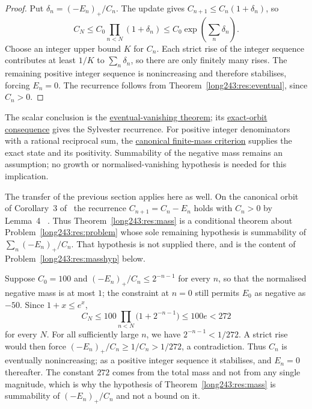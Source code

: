 \documentclass[11pt]{article}
\begin{document}
\begin{proof}
Put \(\delta_n=(-E_n)_+/C_n\). The update gives
\(C_{n+1}\le C_n(1+\delta_n)\), so
\[
 C_N\le C_0\prod_{n<N}(1+\delta_n)
 \le C_0\exp\!\left(\sum_n\delta_n\right).
\]
Choose an integer upper bound \(K\) for \(C_n\). Each strict rise of the
integer sequence contributes at least \(1/K\) to \(\sum_n\delta_n\), so
there are only finitely many rises. The remaining positive integer sequence
is nonincreasing and therefore stabilises, forcing \(E_n=0\). The recurrence
follows from Theorem~\ref{long243:res:eventual}, since \(C_n>0\).
\end{proof}

\noindent The scalar conclusion is the
\href{https://github.com/wcook04/plectis-erdos/blob/d058b9150218ae23d2cfd975580088d6167e9da8/ErdosProblems/Erdos243/SparseResetRecovery.lean#L612}{eventual-vanishing theorem};
its \href{https://github.com/wcook04/plectis-erdos/blob/d058b9150218ae23d2cfd975580088d6167e9da8/ErdosProblems/Erdos243/SparseResetRecovery.lean#L690}{exact-orbit consequence}
gives the Sylvester recurrence. For positive integer denominators with a
rational reciprocal sum, the
\href{https://github.com/wcook04/plectis-erdos/blob/d058b9150218ae23d2cfd975580088d6167e9da8/ErdosProblems/Erdos243/PaperCompleteR8/CanonicalNegativeMass.lean#L19}{canonical finite-mass criterion}
supplies the exact state and its positivity. Summability of the negative mass
remains an assumption; no growth or normalised-vanishing hypothesis is needed
for this implication.

The transfer of the previous section applies here as well.  On the canonical
orbit of Corollary~3 of~\cite[p.~9]{koizumi2025} the recurrence
$C_{n+1}=C_n-E_n$ holds with $C_n>0$ by Lemma~4
~\cite[pp.~11--12]{koizumi2025}. Thus Theorem~\ref{long243:res:mass} is a conditional theorem about
Problem~\ref{long243:res:problem} whose sole remaining hypothesis is summability of
$\sum_n(-E_n)_+/C_n$.  That hypothesis is not supplied there, and is the
content of Problem~\ref{long243:res:masshyp} below.

\begin{example}\label{long243:ex:mass}
Suppose $C_0=100$ and $(-E_n)_+/C_n\le2^{-n-1}$ for every $n$, so that the
normalised negative mass is at most $1$; the constraint at $n=0$ still permits
$E_0$ as negative as $-50$.  Since $1+x\le e^{x}$,
\[
 C_N\le100\prod_{n<N}\bigl(1+2^{-n-1}\bigr)\le100e<272
\]
for every $N$. For all sufficiently large $n$, we have
$2^{-n-1}<1/272$. A strict rise would then force
$(-E_n)_+/C_n\ge1/C_n>1/272$, a contradiction. Thus $C_n$ is eventually
nonincreasing; as a positive integer sequence it stabilises, and $E_n=0$
thereafter. The constant $272$ comes from the total mass and not from any single magnitude,
which is why the hypothesis of Theorem~\ref{long243:res:mass} is summability of
$(-E_n)_+/C_n$ and not a bound on it.
\end{example}
\end{document}
